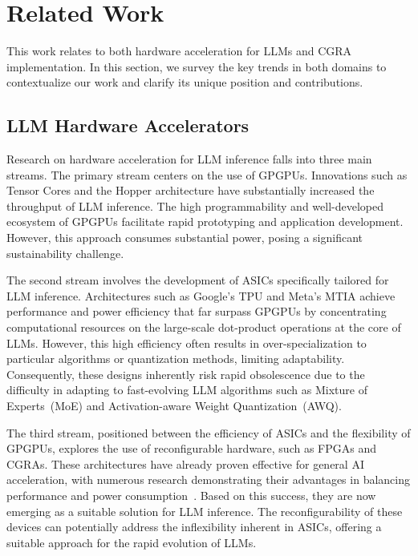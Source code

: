 \section{Related Work}
\label{rwork}
This work relates to both hardware acceleration for LLMs and CGRA implementation.
In this section, we survey the key trends in both domains to contextualize our work and clarify its unique position and contributions.


\subsection{LLM Hardware Accelerators}
Research on hardware acceleration for LLM inference falls into three main streams. 
The primary stream centers on the use of GPGPUs.
Innovations such as Tensor Cores and the Hopper architecture\nobreak\cite{nvidia_h100} have substantially increased the throughput of LLM inference.
The high programmability and well-developed ecosystem of GPGPUs facilitate rapid prototyping and application development\cite{sze2017efficientprocessingdeepneural}.
However, this approach consumes substantial power, posing a significant sustainability challenge\cite{power_consideration}.

The second stream involves the development of ASICs specifically tailored for LLM inference. 
Architectures such as Google's TPU\nobreak\cite{TPU} and Meta's MTIA\nobreak\cite{MTIA} achieve performance and power efficiency that far surpass GPGPUs by concentrating computational resources on the large-scale dot-product operations at the core of LLMs. 
However, this high efficiency often results in over-specialization to particular algorithms or quantization methods, limiting adaptability.
Consequently, these designs inherently risk rapid obsolescence due to the difficulty in adapting to fast-evolving LLM algorithms such as Mixture of Experts~(MoE)\nobreak\cite{MoE} and Activation-aware Weight Quantization~(AWQ)\nobreak\cite{AWQ}.

The third stream, positioned between the efficiency of ASICs and the flexibility of GPGPUs, explores the use of reconfigurable hardware, such as FPGAs and CGRAs. 
These architectures have already proven effective for general AI acceleration, with numerous research demonstrating their advantages in balancing performance and power consumption~\cite{fpgacnn,li2020ftransenergyefficientaccelerationtransformers,vitisai,multi_task}. 
Based on this success, they are now emerging as a suitable solution for LLM inference. 
The reconfigurability of these devices can potentially address the inflexibility inherent in ASICs, offering a suitable approach for the rapid evolution of LLMs. 


